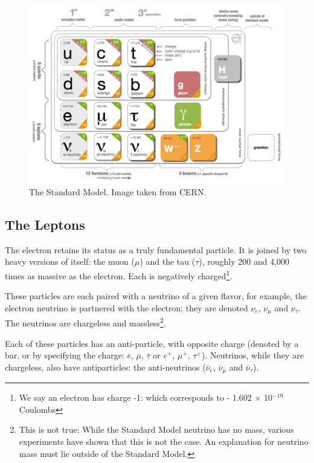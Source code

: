 \begin{figure}[h]
    \centering
        \includegraphics[width=\textwidth]{F1/StandardModelTable}
        \caption{The Standard Model. Image taken from CERN\cite{SMTable}.}
        \label{Fig:Intro:SMTable}
\end{figure}

\clearpage
\subsection{The Leptons}
The electron retains its status as a truly fundamental particle. It is joined by two heavy versions of itself: the muon ($\mu$) and the tau ($\tau$), roughly 200 and 4,000 times as massive as the electron. Each is negatively charged\footnote{We say an electron has charge -1: which corresponds to - 1.602 $\times$ 10$^{-19}$ Coulombs}. 

These particles are each paired with a neutrino of a given flavor, for example, the electron neutrino is partnered with the electron; they are denoted $\nu_e$, $\nu_\mu$ and $\nu_\tau$. The neutrinos are chargeless and massless\footnote{This is not true: While the Standard Model neutrino has no mass, various experiments have shown that this is not the case. An explanation for neutrino mass must lie outside of the Standard Model.}. 

Each of these particles has an anti-particle, with opposite charge (denoted by a bar, or by specifying the charge: $\overline{e}$, $\overline{\mu}$, $\overline{\tau}$ or $e^+$, $\mu^+$, $\tau^+$). Neutrinos, while they are chargeless, also have antiparticles: the anti-neutrinos ($\overline{\nu}_e$, $\overline{\nu}_\mu$ and $\overline{\nu}_\tau$).

